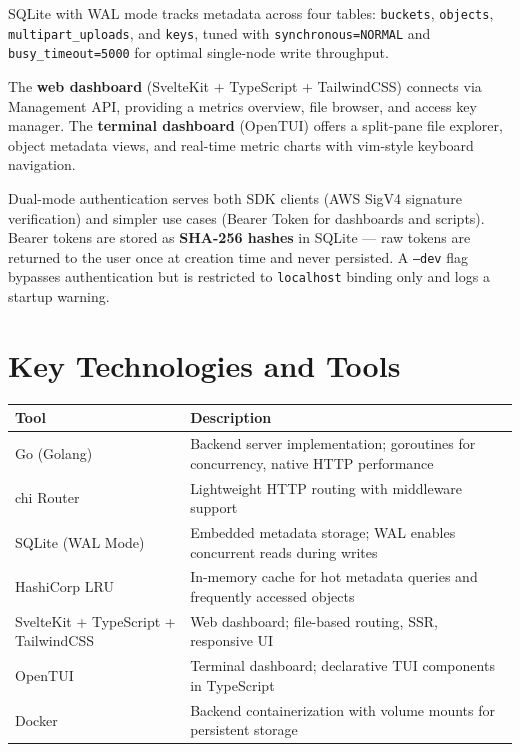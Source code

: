 \documentclass[12pt,a4paper]{report}
\begin{document}
SQLite with WAL mode tracks metadata across four tables: \texttt{buckets}, \texttt{objects}, \texttt{multipart\_uploads}, and \texttt{keys}, tuned with \texttt{synchronous=NORMAL} and \texttt{busy\_timeout=5000} for optimal single-node write throughput.

The \textbf{web dashboard} (SvelteKit + TypeScript + TailwindCSS) connects via Management API, providing a metrics overview, file browser, and access key manager. The \textbf{terminal dashboard} (OpenTUI) offers a split-pane file explorer, object metadata views, and real-time metric charts with vim-style keyboard navigation.

Dual-mode authentication serves both SDK clients (AWS SigV4 signature verification) and simpler use cases (Bearer Token for dashboards and scripts). Bearer tokens are stored as \textbf{SHA-256 hashes} in SQLite --- raw tokens are returned to the user once at creation time and never persisted. A \texttt{--dev} flag bypasses authentication but is restricted to \texttt{localhost} binding only and logs a startup warning.

\section{Key Technologies and Tools}
\begin{table}[H]
\centering
\begin{tabular}{|p{4.5cm}|p{10cm}|}
\toprule
\textbf{Tool} & \textbf{Description} \\
\midrule
Go (Golang) & Backend server implementation; goroutines for concurrency, native HTTP performance \\
\midrule
chi Router & Lightweight HTTP routing with middleware support \\
\midrule
SQLite (WAL Mode) & Embedded metadata storage; WAL enables concurrent reads during writes \\
\midrule
HashiCorp LRU & In-memory cache for hot metadata queries and frequently accessed objects \\
\midrule
SvelteKit + TypeScript + TailwindCSS & Web dashboard; file-based routing, SSR, responsive UI \\
\midrule
OpenTUI & Terminal dashboard; declarative TUI components in TypeScript \\
\midrule
Docker & Backend containerization with volume mounts for persistent storage \\
\bottomrule
\end{tabular}
\end{table}
\end{document}
